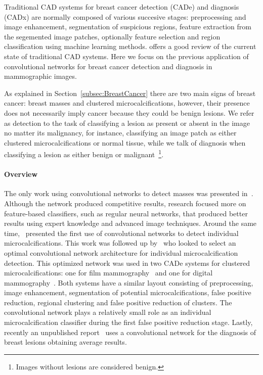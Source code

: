 Traditional CAD systems for breast cancer detection (CADe) and diagnosis (CADx) are normally composed of various succesive stages: preprocessing and image enhancement, segmentation of suspicious regions, feature extraction from the segemented image patches, optionally feature selection and region classification using machine learning methods. \cite{Tang2009} offers a good review of the current state of traditional CAD systems. Here we focus on the previous application of convolutional networks for breast cancer detection and diagnosis in mammographic images.

As explained in Section~\ref{subsec:BreastCancer} there are two main signs of breast cancer: breast masses and clustered microcalcifications, however, their presence does not necessarily imply cancer because they could be benign lesions. We refer as detection to the task of classifying a lesion as present or absent in the image no matter its malignancy, for instance, classifying an image patch as either clustered microcalcifications or normal tissue, while we talk of diagnosis when classifying a lesion as either benign or malignant~\footnote{Images without lesions are considered benign.}.

\paragraph{Overview}
The only work using convolutional networks to detect masses was presented in~\cite{Sahiner1996}. Although the network produced competitive results, research focused more on feature-based classifiers, such as regular neural networks, that produced better results using expert knowledge and advanced image techniques. Around the same time,~\cite{Lo1995} presented the first use of convolutional networks to detect individual microcalcifications. This work was followed up by~\cite{Gurcan2002} who looked to select an optimal convolutional network architecture for individual microcalcification detection. This optimized network was used in two CADe systems for clustered microcalcifications: one for film mammography~\cite{Gurcan2002} and one for digital mammography~\cite{Ge2006}. Both systems have a similar layout consisting of preprocessing, image enhancement, segmentation of potential microcalcifications, false positive reduction, regional clustering and false positive reduction of clusters. The convolutional network plays a relatively small role as an individual microcalcification classifier during the first false positive reduction stage. Lastly, recently an unpublished report~\cite{Agarwal2015} uses a convolutional network for the diagnosis of breast lesions obtaining average results.

